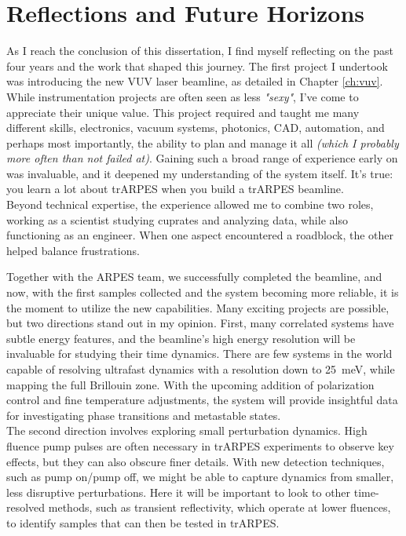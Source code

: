 \cleardoublepage
\chapter*{Reflections and Future Horizons}

As I reach the conclusion of this dissertation, I find myself reflecting on the past four years and the work that shaped this journey.
The first project I undertook was introducing the new VUV laser beamline, as detailed in Chapter \ref{ch:vuv}.
While instrumentation projects are often seen as less \textit{"sexy"}, I’ve come to appreciate their unique value.
This project required and taught me many different skills, electronics, vacuum systems, photonics, CAD, automation, and perhaps most importantly, the ability to plan and manage it all \textit{(which I probably more often than not failed at)}.
Gaining such a broad range of experience early on was invaluable, and it deepened my understanding of the system itself.
It’s true: you learn a lot about trARPES when you build a trARPES beamline.\\
Beyond technical expertise, the experience allowed me to combine two roles, working as a scientist studying cuprates and analyzing data, while also functioning as an engineer.
When one aspect encountered a roadblock, the other helped balance frustrations.

Together with the ARPES team, we successfully completed the beamline, and now, with the first samples collected and the system becoming more reliable, it is the moment to utilize the new capabilities.
Many exciting projects are possible, but two directions stand out in my opinion.
First, many correlated systems have subtle energy features, and the beamline’s high energy resolution will be invaluable for studying their time dynamics.
There are few systems in the world capable of resolving ultrafast dynamics with a resolution down to \qty{25}{\milli\electronvolt}, while mapping the full Brillouin zone.
With the upcoming addition of polarization control and fine temperature adjustments, the system will provide insightful data for investigating phase transitions and metastable states.\\
The second direction involves exploring small perturbation dynamics.
High fluence pump pulses are often necessary in trARPES experiments to observe key effects, but they can also obscure finer details.
With new detection techniques, such as pump on/pump off, we might be able to capture dynamics from smaller, less disruptive perturbations.
Here it will be important to look to other time-resolved methods, such as transient reflectivity, which operate at lower fluences, to identify samples that can then be tested in trARPES.\hfill\break

